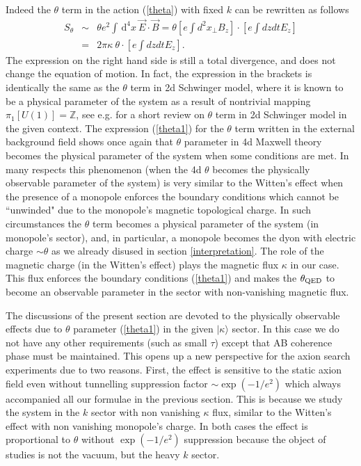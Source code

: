 \documentclass[ twocolumn,aps,prd,   
               preprintnumbers,numbers,sort&compress,nofootinbib,
                            showpacs,superscriptaddress,
               colorlinks,
               linkcolor=blue,   
               citecolor=blue]{revtex4-1}   \newcommand{\exclude}[1]{}
\newcommand{\be}{\begin{eqnarray}}
\newcommand{\ee}{\end{eqnarray}}
\def\dd{ \,\mathrm{d} }
\def\ra{\rangle}
\begin{document}
Indeed the $\theta$ term in the   action (\ref{theta}) with fixed $k$ can be rewritten as follows 
 \be
\label{theta1}
S_{\theta}&\sim &  {\theta} e^2\int \dd^4 x ~\vec{E}\cdot\vec{B} =\theta \left[e \int d^2x_{\perp} B_z\right] \cdot\left[e \int dz dt E_z \right]\nonumber\\
&=&2\pi  \kappa ~\theta \cdot \left[e \int dz dt E_z \right].
 \ee
 The expression on the right hand side is still a total divergence, and does not change the equation of motion. In fact, the expression in the brackets is identically the same as the $\theta$ term in 2d Schwinger model,  where it is known to be a physical parameter of the system as a result of nontrivial 
  mapping $\pi_1[U(1)]=\mathbb{Z}$, see e.g. \cite{Cao:2013na} for a short review on $\theta$ term in 2d Schwinger model in the given context. The expression (\ref{theta1}) for the $\theta$ term written in the external background field    shows once again that $\theta$ parameter in 4d Maxwell  theory  becomes  the physical parameter of the system when some conditions are met. In many respects this phenomenon (when the 4d $\theta$ becomes the physically observable parameter of the system)  is very similar to the Witten's effect \cite{Witten:1979ey} when the presence of a monopole enforces the boundary conditions which cannot be 
  ``unwinded" due to the monopole's magnetic topological charge. In such circumstances the $\theta$ term  becomes a physical  parameter of the system (in  monopole's sector), and, in particular, a 
  monopole becomes the dyon with electric charge $\sim \theta$ as we already disused   in section \ref{interpretation}. 
 The role of the magnetic charge (in the Witten's effect) plays    the magnetic flux $\kappa$   in our case. This flux   enforces the boundary conditions (\ref{theta1}) and makes the $\theta_{\rm QED}$ to become an observable parameter in the sector with non-vanishing magnetic flux.  
    
The   discussions of  the present  section are  devoted to the physically observable effects due to $\theta$ parameter (\ref{theta1}) in the given $|\kappa\ra $ sector. In this case   we do not have any other requirements (such as small $\tau$) except that AB coherence phase must be  maintained. This  opens up a new perspective for the axion search experiments due to two reasons. First, the effect is sensitive to the static   axion field   even  without tunnelling suppression factor $ \sim \exp(-1/e^2)$ which always accompanied  all our formulae in the previous section. %
This is because we study the system in the $k$ sector with non vanishing $\kappa$ flux, similar to the Witten's effect with non vanishing 
monopole's charge. In both cases the effect is proportional to $\theta$ without  $  \exp(-1/e^2)$ suppression because the object of studies is not the vacuum, but the heavy $k$ sector. 
\end{document}
